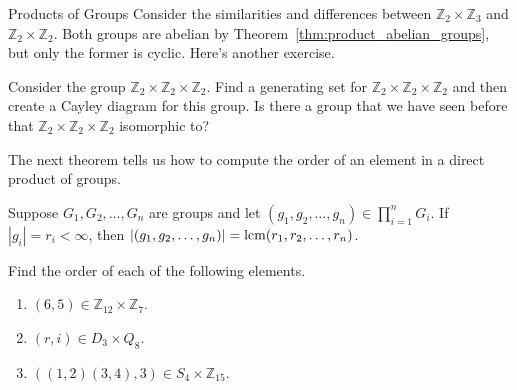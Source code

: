 \begin{section}{Products of Groups}
Consider the similarities and differences between $\mathbb{Z}_2\times \mathbb{Z}_3$ and $\mathbb{Z}_2\times \mathbb{Z}_2$.  Both groups are abelian by Theorem~\ref{thm:product_abelian_groups}, but only the former is cyclic.  Here's another exercise.


\begin{problem}
Consider the group $\mathbb{Z}_2 \times \mathbb{Z}_2 \times \mathbb{Z}_2$.  Find a generating set for $\mathbb{Z}_2 \times \mathbb{Z}_2 \times \mathbb{Z}_2$ and then create a Cayley diagram for this group.  Is there a group that we have seen before that $\mathbb{Z}_2 \times \mathbb{Z}_2 \times \mathbb{Z}_2$ isomorphic to?
\end{problem}

The next theorem tells us how to compute the order of an element in a direct product of groups.

\begin{theorem}
Suppose $G_1, G_2,\ldots, G_n$ are groups and let $(g_1,g_2,\ldots, g_n)\in \prod_{i=1}^nG_i$.  If $|g_i|=r_i<\infty$, then $|(g_1,g_2,\ldots, g_n)|=\operatorname{lcm}(r_1,r_2,\ldots,r_n)$.
\end{theorem}

\begin{problem}
Find the order of each of the following elements.
\begin{enumerate}[label=\textrm{(\alph*)}]
\item $(6,5)\in\mathbb{Z}_{12}\times \mathbb{Z}_7$.
\item $(r,i)\in D_3\times Q_8$.
\item $((1,2)(3,4),3)\in S_4\times \mathbb{Z}_{15}$.
\end{enumerate}
\end{problem}


\end{section}
